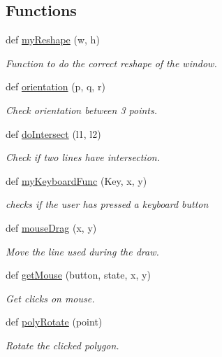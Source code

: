 \subsection*{Functions}
\begin{DoxyCompactItemize}
\item 
def \hyperlink{namespacemain_a5390b522a8b23c1fa7bb4ef88f44e0e7}{my\+Reshape} (w, h)
\begin{DoxyCompactList}\small\item\em Function to do the correct reshape of the window. \end{DoxyCompactList}\item 
def \hyperlink{namespacemain_a462ff643e54edd543bfe037d02a1e43d}{orientation} (p, q, r)
\begin{DoxyCompactList}\small\item\em Check orientation between 3 points. \end{DoxyCompactList}\item 
def \hyperlink{namespacemain_a44b40290550e77e6a15cd18128ad82c2}{do\+Intersect} (l1, l2)
\begin{DoxyCompactList}\small\item\em Check if two lines have intersection. \end{DoxyCompactList}\item 
def \hyperlink{namespacemain_aa99b6d3a6d32218b4f786b4b3e8bee92}{my\+Keyboard\+Func} (Key, x, y)
\begin{DoxyCompactList}\small\item\em checks if the user has pressed a keyboard button \end{DoxyCompactList}\item 
def \hyperlink{namespacemain_a33eac5e1e174927a801f847ff8c2d484}{mouse\+Drag} (x, y)
\begin{DoxyCompactList}\small\item\em Move the line used during the draw. \end{DoxyCompactList}\item 
def \hyperlink{namespacemain_a4aa90045def6d2f29bf7b7a416b5aeed}{get\+Mouse} (button, state, x, y)
\begin{DoxyCompactList}\small\item\em Get clicks on mouse. \end{DoxyCompactList}\item 
def \hyperlink{namespacemain_ae997bdd8d5e0cf367877b065573414d5}{poly\+Rotate} (point)
\begin{DoxyCompactList}\small\item\em Rotate the clicked polygon. \end{DoxyCompactList}\item 

\end{DoxyCompactItemize}
